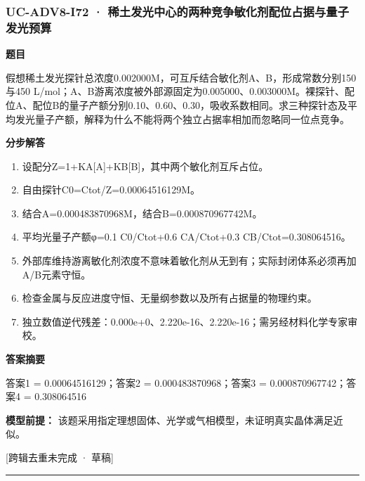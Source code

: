 \documentclass[UTF8,11pt,a4paper]{ctexart}
\begin{document}
\subsubsection*{UC-ADV8-I72 · 稀土发光中心的两种竞争敏化剂配位占据与量子发光预算}
\noindent\textbf{题目}\par
假想稀土发光探针总浓度0.002000M，可互斥结合敏化剂A、B，形成常数分别150与450 L/mol；A、B游离浓度被外部源固定为0.005000、0.003000M。裸探针、配位A、配位B的量子产额分别0.10、0.60、0.30，吸收系数相同。求三种探针态及平均发光量子产额，解释为什么不能将两个独立占据率相加而忽略同一位点竞争。\par
\medskip\noindent\textbf{分步解答}
\begin{enumerate}
\item 设配分Z=1+KA[A]+KB[B]，其中两个敏化剂互斥占位。
\item 自由探针C0=Ctot/Z=0.00064516129M。
\item 结合A=0.000483870968M，结合B=0.000870967742M。
\item 平均光量子产额φ=0.1 C0/Ctot+0.6 CA/Ctot+0.3 CB/Ctot=0.308064516。
\item 外部库维持游离敏化剂浓度不意味着敏化剂从无到有；实际封闭体系必须再加A/B元素守恒。
\item 检查金属与反应进度守恒、无量纲参数以及所有占据量的物理约束。
\item 独立数值逆代残差：0.000e+0、2.220e-16、2.220e-16；需另经材料化学专家审校。
\end{enumerate}
\noindent\textbf{答案摘要}\par
答案1 = 0.00064516129；答案2 = 0.000483870968；答案3 = 0.000870967742；答案4 = 0.308064516\par
\noindent\textbf{模型前提：}
该题采用指定理想固体、光学或气相模型，未证明真实晶体满足近似。\par
\noindent\textcolor{red!65!black}{[跨辑去重未完成 · 草稿]} \par
\medskip\hrule\medskip
{}
\end{document}
